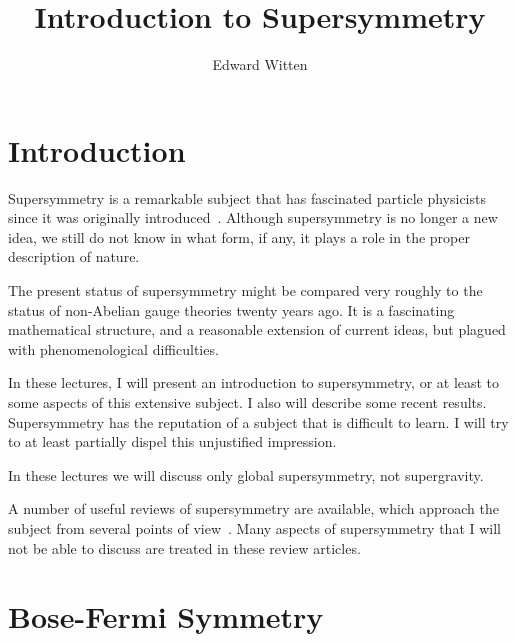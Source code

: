 \documentclass[11pt,a4paper]{article}
\title{Introduction to Supersymmetry}
\author{Edward Witten\note{Supported in part by NSF Grant PHY80-19754.}}
\affiliation{Joseph Henry Laboratories,\\
Princeton University,\\
Princeton, New Jersey 08544}
\begin{document}
\maketitle
\renewcommand{\thefootnote}{\fnsymbol{footnote}}
\setcounter{footnote}{0}
\flushbottom

\section{Introduction}

Supersymmetry is a remarkable subject that has fascinated
particle physicists since it was originally introduced~\cite{ref1}.
Although supersymmetry is no longer a new idea, we still do not know in what
form, if any, it plays a role in the proper description of nature.

The present status of supersymmetry might be compared very
roughly to the status of non-Abelian gauge theories twenty years ago.
It is a fascinating mathematical structure, and a reasonable extension
of current ideas, but plagued with phenomenological difficulties.

In these lectures, I will present an introduction to supersymmetry,
or at least to some aspects of this extensive subject. I
also will describe some recent results. Supersymmetry has the reputation
of a subject that is difficult to learn. I will try to at
least partially dispel this unjustified impression.

In these lectures we will discuss only global supersymmetry,
not supergravity.

A number of useful reviews of supersymmetry are available,
which approach the subject from several points of view~\cite{ref2}.
Many aspects of supersymmetry that I will not be able to discuss are
treated in these review articles.

\section{Bose-Fermi Symmetry}
\end{document}
